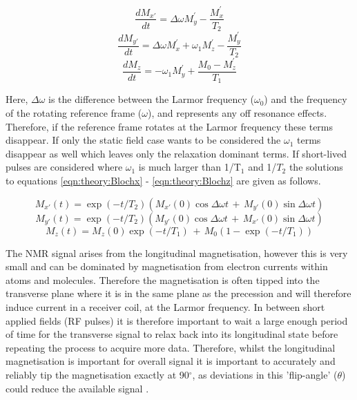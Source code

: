 \begin{equation}
    \frac{dM_{x'}}{dt} = \Delta\omega M_y^{'} - \frac{M_x^{'}}{T_2}
    \label{eqn:theory:Blochx}
\end{equation}
\begin{equation}
    \frac{dM_{y'}}{dt} = \Delta\omega M_x^{'} + \omega_1M_z^{'} - \frac{M_y^{'}}{T_2}
    \label{eqn:theory:Blochy}
\end{equation}
\begin{equation}
    \frac{dM_z}{dt} = -\omega_1M_y^{'} + \frac{M_0-M_z^{'}}{T_1}
    \label{eqn:theory:Blochz}
\end{equation}

Here, $\Delta\omega$ is the difference between the Larmor frequency ($\omega_0$) and the frequency of the rotating reference frame ($\omega$), and represents any off resonance effects. Therefore, if the reference frame rotates at the Larmor frequency these terms disappear. If only the static field case wants to be considered the $\omega_1$ terms disappear as well which leaves only the relaxation dominant terms. If short-lived pulses are considered where $\omega_1$ is much larger than 1/T$_1$ and 1/$T_2$ the solutions to equations \ref{eqn:theory:Blochx} - \ref{eqn:theory:Blochz} are given as follows.

\begin{equation}
    M_{x'}(t) = \exp(-t/T_2) \left( M_{x'}(0)\cos\Delta\omega t \, + \, M_{y'}(0)\sin\Delta\omega t \right)
\end{equation}
\begin{equation}
    M_{y'}(t) = \exp(-t/T_2) \left( M_{y'}(0)\cos\Delta\omega t \, + \, M_{x'}(0)\sin\Delta\omega t \right)
\end{equation}
\begin{equation}
    M_z(t) = M_z(0)\exp(-t/T_1) \, + \, M_0 \left( 1-\exp(-t/T_1) \right)
\end{equation}

The \ac{NMR} signal arises from the longitudinal magnetisation, however this is very small and can be dominated by magnetisation from electron currents within atoms and molecules. Therefore the magnetisation is often tipped into the transverse plane where it is in the same plane as the precession and will therefore induce current in a receiver coil, at the Larmor frequency. In between short applied fields (\ac{RF} pulses) it is therefore important to wait a large enough period of time for the transverse signal to relax back into its longitudinal state before repeating the process to acquire more data. Therefore, whilst the longitudinal magnetisation is important for overall signal it is important to accurately and reliably tip the magnetisation exactly at 90$^\circ$, as deviations in this 'flip-angle' ($\theta$) could reduce the available signal \cite{deGraaf2019InSpectroscopy}.

